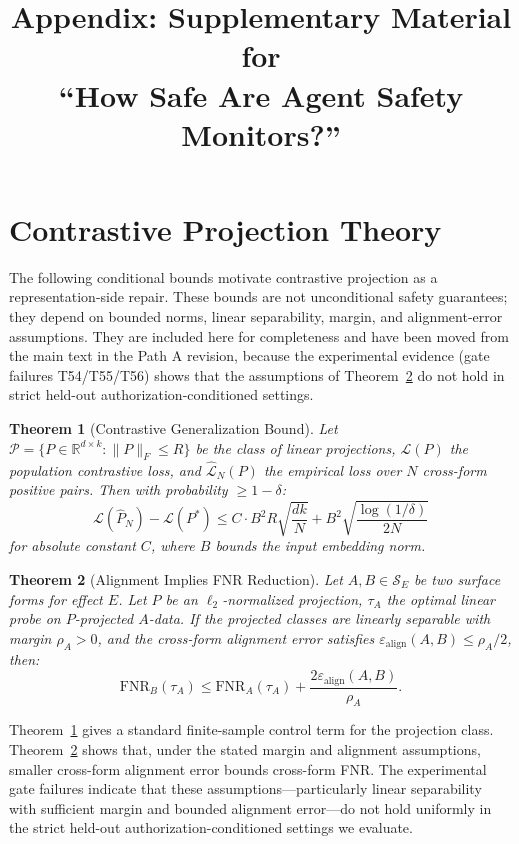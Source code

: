 \documentclass{article}
\title{Appendix: Supplementary Material for\\``How Safe Are Agent Safety Monitors?''}
\newtheorem{theorem}{Theorem}[section]
\begin{document}
\maketitle

\section{Contrastive Projection Theory}

The following conditional bounds motivate contrastive projection as a representation-side repair. These bounds are not unconditional safety guarantees; they depend on bounded norms, linear separability, margin, and alignment-error assumptions. They are included here for completeness and have been moved from the main text in the Path A revision, because the experimental evidence (gate failures T54/T55/T56) shows that the assumptions of Theorem~\ref{thm:alignment} do not hold in strict held-out authorization-conditioned settings.

\begin{theorem}[Contrastive Generalization Bound]
\label{thm:contrastive}
Let $\mathcal{P} = \{P \in \mathbb{R}^{d \times k}: \|P\|_F \leq R\}$ be the class of linear projections, $\mathcal{L}(P)$ the population contrastive loss, and $\hat{\mathcal{L}}_N(P)$ the empirical loss over $N$ cross-form positive pairs. Then with probability $\geq 1-\delta$:
$$\mathcal{L}(\hat{P}_N) - \mathcal{L}(P^*) \leq C \cdot B^2 R \sqrt{\frac{dk}{N}} + B^2 \sqrt{\frac{\log(1/\delta)}{2N}}$$
for absolute constant $C$, where $B$ bounds the input embedding norm.
\end{theorem}

\begin{theorem}[Alignment Implies FNR Reduction]
\label{thm:alignment}
Let $A, B \in \mathcal{S}_E$ be two surface forms for effect $E$. Let $P$ be an $\ell_2$-normalized projection, $\tau_A$ the optimal linear probe on $P$-projected $A$-data. If the projected classes are linearly separable with margin $\rho_A > 0$, and the cross-form alignment error satisfies $\varepsilon_{\text{align}}(A, B) \leq \rho_A/2$, then:
$$\text{FNR}_B(\tau_A) \leq \text{FNR}_A(\tau_A) + \frac{2\varepsilon_{\text{align}}(A, B)}{\rho_A}.$$
\end{theorem}

Theorem~\ref{thm:contrastive} gives a standard finite-sample control term for the projection class. Theorem~\ref{thm:alignment} shows that, under the stated margin and alignment assumptions, smaller cross-form alignment error bounds cross-form FNR. The experimental gate failures indicate that these assumptions---particularly linear separability with sufficient margin and bounded alignment error---do not hold uniformly in the strict held-out authorization-conditioned settings we evaluate.
\end{document}

